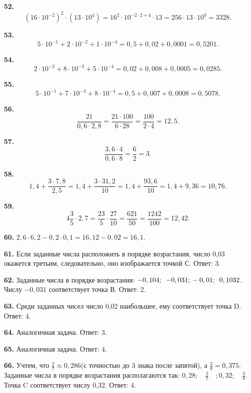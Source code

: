 \textbf{52.} $$\left(16\cdot10^{-2}\right)^2\cdot\left(13\cdot10^4\right)=16^2\cdot10^{-2\cdot2+4}\cdot13=256\cdot13\cdot10^0=3328.$$

\textbf{53.} $$5\cdot10^{-1}+2\cdot10^{-2}+1\cdot10^{-4}=0,5+0,02+0,0001=0,5201.$$

\textbf{54.} $$2\cdot10^{-2}+8\cdot10^{-3}+5\cdot10^{-4}=0,02+0,008+0,0005=0,0285.$$

\textbf{55.} $$5\cdot10^{-1}+7\cdot10^{-3}+8\cdot10^{-4}=0,5+0,007+0,0008=0,5078.$$

\textbf{56.} $$\frac{21}{0,6\cdot2,8}=\frac{21\cdot100}{6\cdot28}=\frac{100}{2\cdot4}=12,5.$$

\newpage \textbf{57.} $$\frac{3,6\cdot4}{0,6\cdot8}=\frac{6}{2}=3.$$

\textbf{58.} $$1,4+\frac{3\cdot7,8}{2,5}=1,4+\frac{3\cdot31,2}{10}=1,4+\frac{93,6}{10}=1,4+9,36=10,76.$$

\textbf{59.} $$4\frac{3}{5}\cdot2,7=\frac{23}{5}\cdot\frac{27}{10}=\frac{621}{50}=\frac{1242}{100}=12,42.$$

\textbf{60.} $2,6\cdot6,2-0,2\cdot0,1=16,12-0,02=16,1.$

\textbf{61.}  Если заданные числа расположить в порядке возрастания, число 0,03 окажется третьим, следовательно, оно изображается точкой С. \newline \null \hspace*{\fill} Ответ: 3. 


\textbf{62.}  Заданные числа в порядке возрастания: $-0,104;\enspace -0,031;\newline -0,01;\enspace 0,1032$. Числу $-0,031$ соответствует точка В. \newline \null \hspace*{\fill} Ответ: 2. 

\textbf{63.}  Среди заданных чисел число 0,02 наибольшее, ему соответствует точка D. \newline \null \hspace*{\fill} Ответ: 4. 

\textbf{64.}  Аналогичная задача. \newline \null \hspace*{\fill} Ответ: 3. 

\textbf{65.}  Аналогичная задача. \newline \null \hspace*{\fill} Ответ: 4. 

\textbf{66.}  Учтем, что $\frac{2}{7}\approx0,286$(с точностью до 3 знака после запятой), а $\frac{3}{8}=0,375$. Заданные числа  в порядке возрастания располагаются так: $0,28;\quad\frac{2}{7}\quad;0,32;\quad\frac{3}{8}$. Точка C соответствует числу 0,32. \newline \null \hspace*{\fill} Ответ: 4. 

